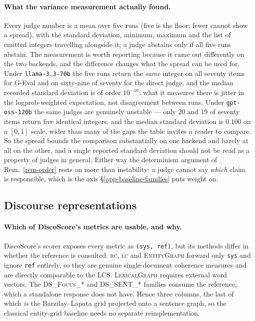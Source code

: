 \paragraph{What the variance measurement actually found.} Every judge number is a mean over five runs
(five is the floor; fewer cannot show a spread), with the standard deviation, minimum, maximum and the
list of emitted integers travelling alongside it; a judge abstains only if all five runs abstain. The
measurement is worth reporting because it came out differently on the two backends, and the difference
changes what the spread can be used for. Under \texttt{llama-3.3-70b} the five runs return the
\emph{same} integer on all seventy items for G-Eval and on sixty-nine of seventy for the direct judge,
and the median recorded standard deviation is of order $10^{-10}$: what it measures there is jitter in
the logprob-weighted expectation, not disagreement between runs. Under \texttt{gpt-oss-120b} the same
judges are genuinely unstable --- only $20$ and $19$ of seventy items return five identical integers,
and the median standard deviation is $0.100$ on a $[0,1]$ scale, wider than many of the gaps the table
invites a reader to compare. So the spread bounds the comparison substantially on one backend and
barely at all on the other, and a single reported standard deviation should not be read as a property
of judges in general. Either way the determinism argument of Rem.~\ref{rem-order} rests on more than
instability: a judge cannot say \emph{which} claim is responsible, which is the axis
\S\ref{app-baseline-families} puts weight on.


\subsection{Discourse representations}
\label{app-baseline-discourse}

\paragraph{Which of DiscoScore's metrics are usable, and why.} DiscoScore's scorer exposes every
metric as \texttt{(sys, ref)}, but its methods differ in whether the reference is consulted.
\textsc{rc}, \textsc{lc} and \textsc{EntityGraph} forward only \texttt{sys} and ignore \texttt{ref}
entirely, so they are genuine single-document coherence measures and are directly comparable to the
LCS. \textsc{LexicalGraph} requires external word vectors. The \textsc{DS\_Focus\_*} and
\textsc{DS\_SENT\_*} families consume the reference, which a standalone response does not have. Hence
three columns, the last of which \emph{is} the Barzilay--Lapata grid projected onto a sentence graph,
so the classical entity-grid baseline needs no separate reimplementation.

